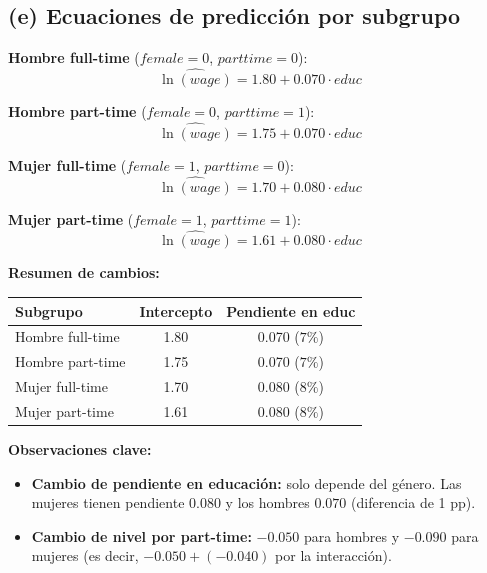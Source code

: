 \documentclass[10pt,a4paper]{article}
\begin{document}
\begin{enumerate}
\subsection*{(e) Ecuaciones de predicción por subgrupo}

\textbf{Hombre full-time} (\(female=0\), \(parttime=0\)):
\[
\widehat{\ln(wage)} = 1.80 + 0.070 \cdot educ
\]

\textbf{Hombre part-time} (\(female=0\), \(parttime=1\)):
\[
\widehat{\ln(wage)} = 1.75 + 0.070 \cdot educ
\]

\textbf{Mujer full-time} (\(female=1\), \(parttime=0\)):
\[
\widehat{\ln(wage)} = 1.70 + 0.080 \cdot educ
\]

\textbf{Mujer part-time} (\(female=1\), \(parttime=1\)):
\[
\widehat{\ln(wage)} = 1.61 + 0.080 \cdot educ
\]

\vspace{0.3cm}

\textbf{Resumen de cambios:}

\begin{center}
\begin{tabular}{lcc}
\toprule
\textbf{Subgrupo} & \textbf{Intercepto} & \textbf{Pendiente en educ} \\
\midrule
Hombre full-time & 1.80 & 0.070 (\(7\%\)) \\
Hombre part-time & 1.75 & 0.070 (\(7\%\)) \\
Mujer full-time  & 1.70 & 0.080 (\(8\%\)) \\
Mujer part-time  & 1.61 & 0.080 (\(8\%\)) \\
\bottomrule
\end{tabular}
\end{center}

\textbf{Observaciones clave:}
\begin{itemize}[leftmargin=2em]
    \item \textbf{Cambio de pendiente en educación:} solo depende del género. Las mujeres tienen pendiente \(0.080\) y los hombres \(0.070\) (diferencia de 1 pp).
    \item \textbf{Cambio de nivel por part-time:} \(-0.050\) para hombres y \(-0.090\) para mujeres (es decir, \(-0.050 + (-0.040)\) por la interacción).
\end{itemize}


\end{enumerate}

    
\end{document}
